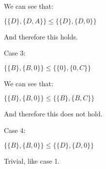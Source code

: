 We can see that:

$\{\{D\},\{D,A\}\}\le \{\{D\},\{D,0\}\}$

And therefore this holds.

Case 3:

$\{\{B\},\{B,0\}\}\le \{\{0\},\{0,C\}\}$

We can see that:

$\{\{B\},\{B,0\}\}\le \{\{B\},\{B,C\}\}$

And therefore this does not hold.

Case 4:

$\{\{B\},\{B,0\}\}\le \{\{D\},\{D,0\}\}$

Trivial, like case 1.

